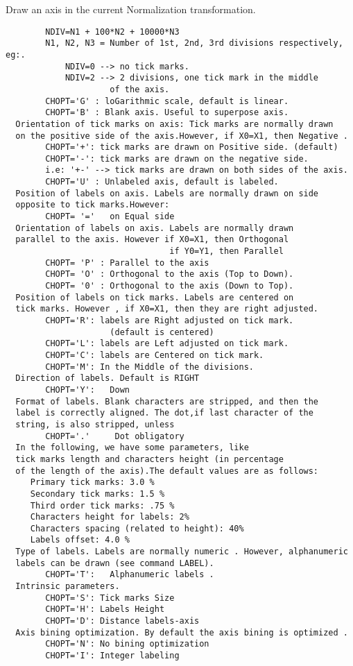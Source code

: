 \BEGARG
{}
\ENDARG
\BEGTEXT
Draw an axis in the current Normalization transformation.
\begin{verbatim}
        NDIV=N1 + 100*N2 + 10000*N3
        N1, N2, N3 = Number of 1st, 2nd, 3rd divisions respectively, eg:.
            NDIV=0 --> no tick marks.
            NDIV=2 --> 2 divisions, one tick mark in the middle
                     of the axis.
        CHOPT='G' : loGarithmic scale, default is linear.
        CHOPT='B' : Blank axis. Useful to superpose axis.
  Orientation of tick marks on axis: Tick marks are normally drawn
  on the positive side of the axis.However, if X0=X1, then Negative .
        CHOPT='+': tick marks are drawn on Positive side. (default)
        CHOPT='-': tick marks are drawn on the negative side.
        i.e: '+-' --> tick marks are drawn on both sides of the axis.
        CHOPT='U' : Unlabeled axis, default is labeled.
  Position of labels on axis. Labels are normally drawn on side
  opposite to tick marks.However:
        CHOPT= '='   on Equal side
  Orientation of labels on axis. Labels are normally drawn
  parallel to the axis. However if X0=X1, then Orthogonal
                                 if Y0=Y1, then Parallel
        CHOPT= 'P' : Parallel to the axis
        CHOPT= 'O' : Orthogonal to the axis (Top to Down).
        CHOPT= '0' : Orthogonal to the axis (Down to Top).
  Position of labels on tick marks. Labels are centered on
  tick marks. However , if X0=X1, then they are right adjusted.
        CHOPT='R': labels are Right adjusted on tick mark.
                     (default is centered)
        CHOPT='L': labels are Left adjusted on tick mark.
        CHOPT='C': labels are Centered on tick mark.
        CHOPT='M': In the Middle of the divisions.
  Direction of labels. Default is RIGHT
        CHOPT='Y':   Down
  Format of labels. Blank characters are stripped, and then the
  label is correctly aligned. The dot,if last character of the
  string, is also stripped, unless
        CHOPT='.'     Dot obligatory
  In the following, we have some parameters, like
  tick marks length and characters height (in percentage
  of the length of the axis).The default values are as follows:
     Primary tick marks: 3.0 %
     Secondary tick marks: 1.5 %
     Third order tick marks: .75 %
     Characters height for labels: 2%
     Characters spacing (related to height): 40%
     Labels offset: 4.0 %
  Type of labels. Labels are normally numeric . However, alphanumeric
  labels can be drawn (see command LABEL).
        CHOPT='T':   Alphanumeric labels .
  Intrinsic parameters.
        CHOPT='S': Tick marks Size
        CHOPT='H': Labels Height
        CHOPT='D': Distance labels-axis
  Axis bining optimization. By default the axis bining is optimized .
        CHOPT='N': No bining optimization
        CHOPT='I': Integer labeling
\end{verbatim}
\ENDTEXT

